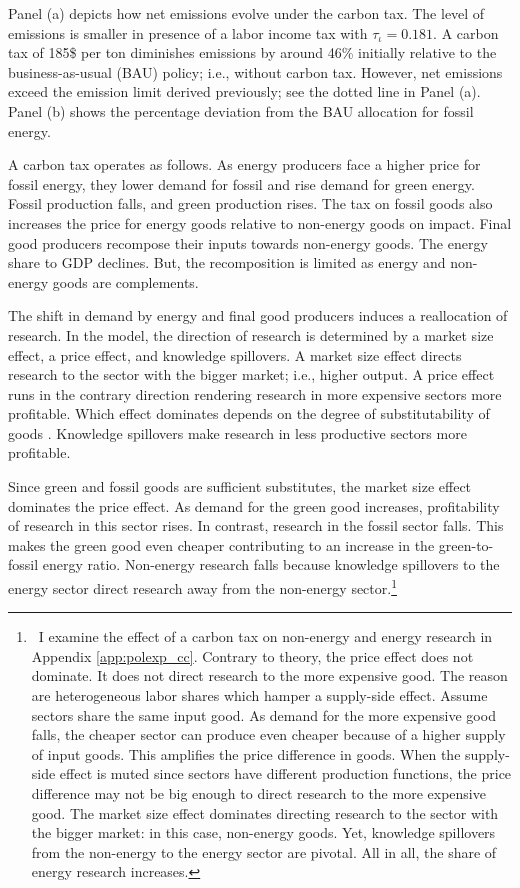 Panel (a) depicts how net emissions evolve under the carbon tax. The level of emissions is smaller in presence of a labor income tax with $\tau_{\iota}=0.181$.   A carbon tax of 185\$ per ton diminishes emissions by around 46\% initially relative to the business-as-usual (BAU) policy; i.e., without carbon tax. However, net emissions exceed the emission limit  derived previously; see the dotted line in Panel (a). Panel (b) shows the percentage deviation from the BAU allocation for fossil energy.
  
A carbon tax operates as follows. As energy producers face a higher price for fossil energy, they lower demand for fossil and rise demand for green energy. Fossil production falls, and green production rises.
 The tax on fossil goods also increases the price for energy goods relative to non-energy goods on impact. Final good producers recompose their inputs towards non-energy goods. The energy share to GDP declines.  But, the recomposition is limited as energy and non-energy goods are complements. 
 
 The shift in demand by energy and final good producers induces a reallocation of research. In the model, the direction of research is determined by a market size effect, a price effect, and knowledge spillovers. 
 A market size effect directs research to the sector with the bigger market; i.e., higher output. A price effect runs in the contrary direction rendering research in more expensive sectors more profitable. Which effect dominates depends on the degree of substitutability of goods \citep{Acemoglu2002DirectedChange, Hemous2021DirectedEconomics}. Knowledge spillovers make research in less productive sectors more profitable.
 
 Since green and fossil goods are sufficient substitutes, the market size effect dominates the price effect. As demand for the green good increases, profitability of research in  this sector rises. In contrast, research in the fossil sector falls. This makes the green good even cheaper contributing to an increase in the green-to-fossil energy ratio.
Non-energy research falls because knowledge spillovers to the energy sector direct research away from the non-energy sector.\footnote{\ I examine the effect of a carbon tax on non-energy and energy research in Appendix \ref{app:polexp_cc}. Contrary to theory, the price effect does not dominate. It does not direct research to the more expensive good. The reason are heterogeneous labor shares which hamper a supply-side effect. Assume sectors share the same input good. As demand for the more expensive good falls, the cheaper sector can produce even cheaper because of a higher supply of input goods. This amplifies the price difference in goods. When the supply-side effect is muted since sectors have different production functions, the price difference may not be big enough to direct research to the more expensive good. The market size effect dominates directing research to the sector with the bigger market: in this case, non-energy goods. Yet, knowledge spillovers from the non-energy to the energy sector are pivotal. All in all, the share of energy research increases.}
 
